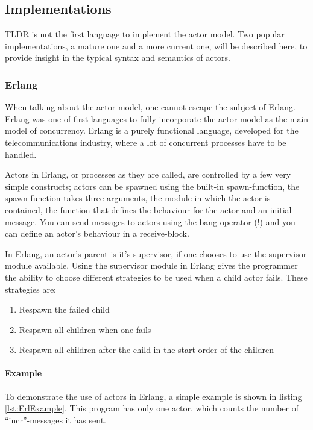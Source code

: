 \subsection{Implementations}\label{sub:implementations}
TLDR is not the first language to implement the actor model. Two popular implementations, a mature one and a more current one, will be described here, to provide insight in the typical syntax and semantics of actors.

\subsubsection{Erlang}
When talking about the actor model, one cannot escape the subject of Erlang. Erlang was one of first languages to fully incorporate the actor model as the main model of concurrency. Erlang is a purely functional language, developed for the telecommunications industry, where a lot of concurrent processes have to be handled. 

Actors in Erlang, or processes as they are called, are controlled by a few very simple constructs; actors can be spawned using the built-in spawn-function, the spawn-function takes three arguments, the module in which the actor is contained, the function that defines the behaviour for the actor and an initial message. You can send messages to actors using the bang-operator (!) and you can define an actor's behaviour in a receive-block.

In Erlang, an actor's parent is it's supervisor, if one chooses to use the supervisor module available. Using the supervisor module in Erlang gives the programmer the ability to choose different strategies to be used when a child actor fails. These strategies are:
\begin{enumerate}
  \item Respawn the failed child
  \item Respawn all children when one fails
  \item Respawn all children after the child in the start order of the children
\end{enumerate}

\paragraph{Example}
To demonstrate the use of actors in Erlang, a simple example is shown in listing \ref{lst:ErlExample}. This program has only one actor, which counts the number of \enquote{incr}-messages it has sent.

